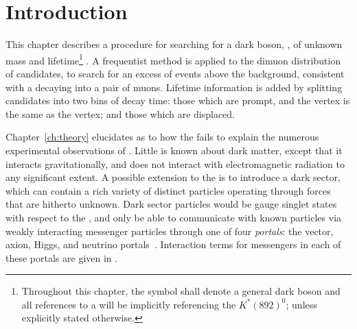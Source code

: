 \section{Introduction}
\label{sec:db:intro}


This chapter describes a procedure for searching for a dark boson, \db, of
unknown mass and lifetime\footnote{
  Throughout this chapter, the symbol \db shall denote a general dark boson and all references to
  a \Kstarz will be implicitly referencing the $K^*(892)^0$; unless explicitly stated otherwise.
} .
A frequentist method is applied to the dimuon distribution of \btokstrmumu candidates,
to search for an excess of events above the \sm background, consistent with a \db decaying into a
pair of muons.
Lifetime information is added by
splitting candidates into two bins of decay time: those which are prompt, and the \db vertex is the
same as the \Kstarz vertex; and
those which are displaced.

Chapter~\ref{ch:theory} elucidates as to how the \sm fails to explain
the numerous experimental observations of \dm.
Little is known about dark matter, except that it interacts gravitationally, and does not interact
with electromagnetic radiation to any significant extent.
A possible extension to the \sm is to introduce a dark sector, which can contain a rich variety of
distinct particles operating through forces that are hitherto unknown.
Dark sector particles would be gauge singlet states with respect to the \sm, and
only be able to communicate with known particles via weakly interacting messenger particles
through one of four \emph{portals}: the vector, axion, Higgs, and neutrino
portals~\cite{Essig:2013lka}.
Interaction terms for messengers in each of these portals are given in
.

